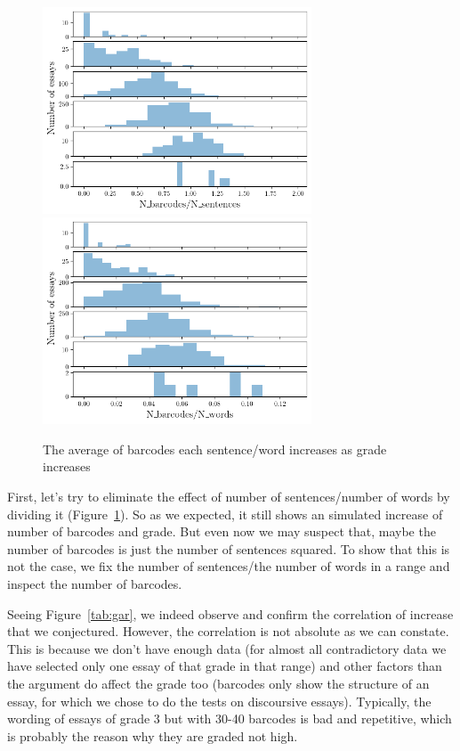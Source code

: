 \begin{figure}[H]
  \includegraphics[width=8cm]{gradesah1s.png}
  \includegraphics[width=8cm]{gradesah1w.png}
  \caption{The average of barcodes each sentence/word increases as grade increases}
  \label{fig:ads}
\end{figure}

First, let's try to eliminate the effect of number of sentences/number of words
by dividing it (Figure~\ref{fig:ads}). So as we expected, it still shows an simulated
increase of number of barcodes and grade. But even now we may suspect that,
maybe the number of barcodes is just the number of sentences squared. To show that
this is not the case, we fix the number of sentences/the number of words in a range
and inspect the number of barcodes.



Seeing Figure~\ref{tab:gar}, we indeed observe and confirm the correlation of increase
that we conjectured. However, the correlation is not absolute as we can constate.
This is because we don't have enough data (for almost all contradictory data
we have selected only one essay of that grade in that range) and other factors than the argument
do affect the grade too (barcodes only show the structure of an essay, for which we
chose to do the tests on discoursive essays). Typically, the wording
of essays of grade 3 but with 30-40 barcodes is bad and repetitive, which is
probably the reason why they are graded not high.

